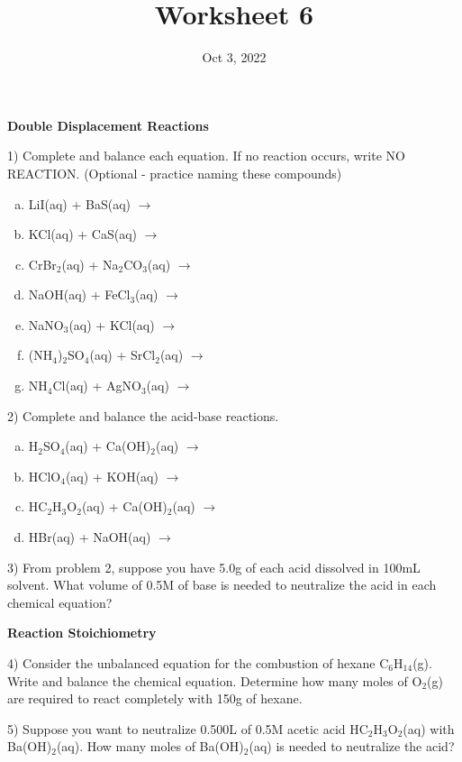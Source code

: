 \documentclass[12pt]{article}
\title{\textbf{Worksheet 6}}
\date{Oct 3, 2022}
\begin{document}
\maketitle 

\textbf{Double Displacement Reactions}

1) Complete and balance each equation. If no reaction occurs,
write NO REACTION. (Optional - practice naming these compounds)

\begin{enumerate}[(a)]
\item LiI(aq) + BaS(aq) $\rightarrow$
\item KCl(aq) + CaS(aq) $\rightarrow$
\item CrBr$_2$(aq) + Na$_2$CO$_3$(aq) $\rightarrow$
\item NaOH(aq) + FeCl$_3$(aq) $\rightarrow$
\item NaNO$_3$(aq) + KCl(aq) $\rightarrow$
\item (NH$_4$)$_2$SO$_4$(aq) + SrCl$_2$(aq) $\rightarrow$
\item NH$_4$Cl(aq) + AgNO$_3$(aq) $\rightarrow$
\end{enumerate}

2) Complete and balance the acid-base reactions.

\begin{enumerate}[(a)]
\item H$_2$SO$_4$(aq) + Ca(OH)$_2$(aq) $\rightarrow$
\item HClO$_4$(aq) + KOH(aq) $\rightarrow$
\item HC$_2$H$_3$O$_2$(aq) + Ca(OH)$_2$(aq) $\rightarrow$
\item HBr(aq) + NaOH(aq) $\rightarrow$
\end{enumerate}

3) From problem 2, suppose you have 5.0g of each acid dissolved
in 100mL solvent. What volume of 0.5M of base is needed to neutralize
the acid in each chemical equation?

\newpage

\textbf{Reaction Stoichiometry}

4) Consider the unbalanced equation for the combustion of hexane
C$_6$H$_{14}$(g). Write and balance the chemical equation. Determine
how many moles of O$_2$(g) are required to react completely with
150g of hexane.

5) Suppose you want to neutralize 0.500L of 0.5M acetic
acid HC$_2$H$_3$O$_2$(aq) with Ba(OH)$_2$(aq). How many moles of
Ba(OH)$_2$(aq) is needed to neutralize the acid?
\end{document}
